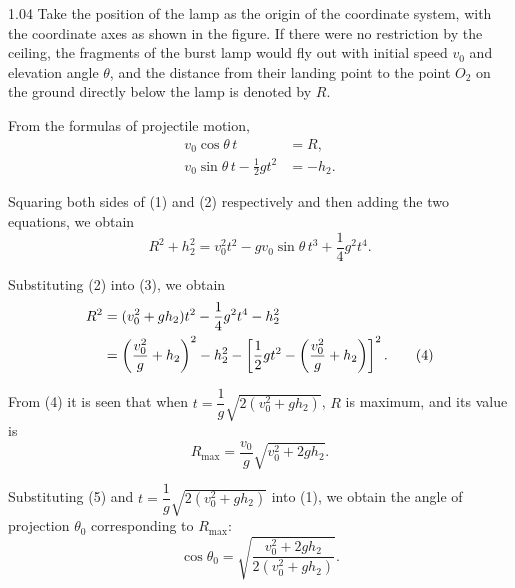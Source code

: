 \begin{solution}{1.04}
Take the position of the lamp as the origin of the coordinate system, with the coordinate axes
as shown in the figure. If there were no restriction by the ceiling, the fragments of the burst
lamp would fly out with initial speed $v_0$ and elevation angle $\theta$, and the distance from
their landing point to the point $O_2$ on the ground directly below the lamp is denoted by $R$.

From the formulas of projectile motion,
\begin{align}
v_0\cos\theta\, t &= R, \tag{1}\\
v_0\sin\theta\, t - \frac{1}{2}gt^2 &= -h_2. \tag{2}
\end{align}

Squaring both sides of (1) and (2) respectively and then adding the two equations, we obtain
\begin{equation}
R^2+h_2^2 = v_0^2t^2-gv_0\sin\theta\,t^3+\frac{1}{4}g^2t^4. \tag{3}
\end{equation}

Substituting (2) into (3), we obtain
\begin{align}
R^2 &= (v_0^2+gh_2)t^2-\frac{1}{4}g^2t^4-h_2^2\notag\\
&= \left(\frac{v_0^2}{g}+h_2\right)^2-h_2^2
-\left[\frac{1}{2}gt^2-\left(\frac{v_0^2}{g}+h_2\right)\right]^2. \tag{4}
\end{align}

From (4) it is seen that when $t=\dfrac{1}{g}\sqrt{2(v_0^2+gh_2)}$, $R$ is maximum, and its
value is
\begin{equation}
R_{\max} = \frac{v_0}{g}\sqrt{v_0^2+2gh_2}. \tag{5}
\end{equation}

Substituting (5) and $t=\dfrac{1}{g}\sqrt{2(v_0^2+gh_2)}$ into (1), we obtain the angle of
projection $\theta_0$ corresponding to $R_{\max}$:
\begin{equation}
\cos\theta_0 = \sqrt{\frac{v_0^2+2gh_2}{2(v_0^2+gh_2)}}. \tag{6}
\end{equation}


\end{solution}
